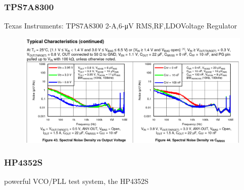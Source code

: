 \documentclass{article}
\begin{document}

\subsubsection*{TPS7A8300}

Texas Instruments: TPS7A8300 2-A,6-\unit{\micro\volt} RMS,RF,LDOVoltage Regulator

\begin{figure}[ht!]
	\includegraphics[width=0.5\linewidth]{Figures/LDO-noise-characteristic.png}
	\label{fig:ldo-noise-documntation}
\end{figure}


\subsubsection*{HP4352S}

powerful VCO/PLL test system, the HP4352S





\end{document}

